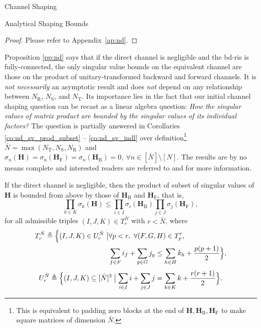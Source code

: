 \documentclass[journal]{IEEEtran}
\begin{document}
\begin{section}{Channel Shaping}
\begin{subsection}{Analytical Shaping Bounds}
		\begin{proof}
			Please refer to Appendix~\ref{ap:nd}.
		\end{proof}

		Proposition \ref{pp:nd} says that if the direct channel is negligible and the \gls{bd}-\gls{ris} is fully-connected, the only singular value bounds on the equivalent channel are those on the product of unitary-transformed backward and forward channels.
		It is \emph{not necessarily} an asymptotic result and does \emph{not} depend on any relationship between $N_\mathrm{R}$, $N_\mathrm{S}$, and $N_\mathrm{T}$.
		Its importance lies in the fact that our initial channel shaping question can be recast as a linear algebra question: \emph{How the singular values of matrix product are bounded by the singular values of its individual factors?}
		The question is partially answered in Corollaries \ref{co:nd_sv_prod_subset} -- \ref{co:nd_sv_indl} over definition\footnote{This is equivalent to padding zero blocks at the end of $\mathbf{H}, \mathbf{H}_\mathrm{B}, \mathbf{H}_\mathrm{F}$ to make square matrices of dimension $\bar{N}$.} $\bar{N} = \max(N_\mathrm{T},N_\mathrm{S},N_\mathrm{R})$ and $\sigma_n(\mathbf{H})=\sigma_n(\mathbf{H}_\mathrm{F})=\sigma_n(\mathbf{H}_\mathrm{B})=0, \ \forall n \in [\bar{N}] \setminus [N]$.
		The results are by no means complete and interested readers are referred to \cite[Chapter 16, 24]{Hogben2013} and \cite[Chapter 3]{Horn1994} for more information.


		\begin{corollary}
			\label{co:nd_sv_prod_subset}
			If the direct channel is negligible,
			then the product of subset of singular values of $\mathbf{H}$ is bounded from above by those of $\mathbf{H}_\mathrm{B}$ and $\mathbf{H}_\mathrm{F}$, that is,
			\begin{equation}
				\label{iq:horn}
				\prod_{k \in {K}} \sigma_k(\mathbf{H}) \le \prod_{i \in {I}} \sigma_i(\mathbf{H}_\mathrm{B}) \prod_{j \in {J}} \sigma_j(\mathbf{H}_\mathrm{F}),
			\end{equation}
			for all admissible triples $(I, J, K) \in T_r^{\bar{N}}$ with $r < \bar{N}$, where
			\begin{equation*}
				\begin{split}
					T_r^{\bar{N}} \triangleq \Bigl\{(I, J, K) \in U_r^{\bar{N}} \bigm\vert & \forall p < r, \ \forall (F, G, H) \in T_p^r,                                              \\
																							& \sum_{f \in F} i_f + \sum_{g \in G} j_g \le \sum_{h \in H} k_h + \frac{p(p+1)}{2} \Bigr\},
				\end{split}
			\end{equation*}
			\begin{equation*}
				U_r^{\bar{N}} \triangleq \Bigl\{(I, J, K) \subseteq [\bar{N}]^3 \bigm\vert \sum_{i \in I} i + \sum_{j \in J} j = \sum_{k \in K} k + \frac{r(r+1)}{2}\Bigr\}.
			\end{equation*}
		\end{corollary}


\end{subsection}
\end{section}
\end{document}
